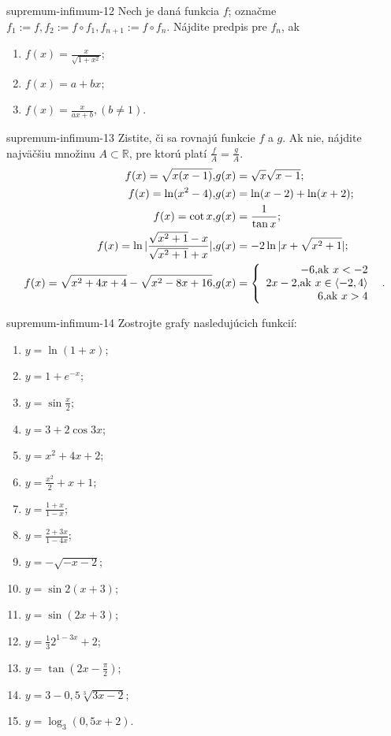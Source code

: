 \begin{defproblem}{supremum-infimum-12}
Nech je daná funkcia $f$; označme $f_1:=f,f_2:=f\circ f_1,f_{n+1}:=f\circ f_n$. Nájdite predpis pre $f_n$, ak
\begin{enumerate}
\item $f(x)=\frac{x}{\sqrt{1+x^2}}$;
\item $f(x)=a+bx$;
\item $f(x)=\frac{x}{ax+b},(b\neq 1)$.
\end{enumerate}
\end{defproblem}

\begin{defproblem}{supremum-infimum-13}
Zistite, či sa rovnajú funkcie $f$ a $g$. Ak nie, nájdite najväčšiu množinu $A\subset\mathbb{R}$, pre ktorú platí $\frac{f}{A}=\frac{g}{A}$.
\begin{align*}
f(x)=\sqrt{x(x-1)}, & g(x)=\sqrt{x}\sqrt{x-1};\\
f(x)=\ln (x^2-4), & g(x)=\ln (x-2)+\ln (x+2);\\
f(x)=\cot x, & g(x)=\frac{1}{\tan x};\\
f(x)=\ln |\frac{\sqrt{x^2+1}-x}{\sqrt{x^2+1}+x}|, & g(x)=-2\ln |x+\sqrt{x^2+1}|;\\
f(x)=\sqrt{x^2+4x+4}-\sqrt{x^2-8x+16}, & g(x)= \left\{ \begin{array}{r@{\quad}c}
    -6, $ak $ x<-2 \\
    2x-2, $ak $ x\in\langle -2,4 \rangle \\
   6, $ak $ x>4 \\ \end{array} \right. .
\end{align*}
\end{defproblem}

\begin{defproblem}{supremum-infimum-14}
Zostrojte grafy nasledujúcich funkcií:
\begin{multicols}{2}
\begin{enumerate}
    \item $y=\ln (1+x)$;
    \item $y=1+e^{-x}$;
    \item $y=\sin \frac{x}{2}$;
    \item $y=3+2\cos 3x$;
    \item $y=x^2+4x+2$;
    \item $y=\frac{x^2}{2}+x+1$;
    \item $y=\frac{1+x}{1-x}$;
    \item $y=\frac{2+3x}{1-4x}$;
    \item $y=-\sqrt{-x-2}$;
    \item $y=\sin 2(x+3)$;
    \item $y=\sin (2x+3)$;
    \item $y=\frac{1}{3}2^{1-3x}+2$;
    \item $y=\tan (2x-\frac{\pi}{2})$;
    \item $y=3-0,5\sqrt[3]{3x-2}$;
    \item $y=\log_3 (0,5x+2)$.
\end{enumerate}
\end{multicols}
\end{defproblem}

